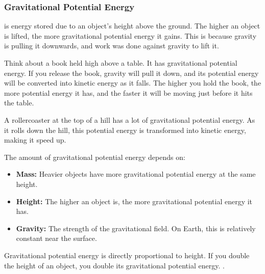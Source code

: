 \subsubsection{Gravitational Potential Energy}

 is energy stored due to an object's height above the ground.  The higher an object is lifted, the more gravitational potential energy it gains. This is because gravity is pulling it downwards, and work was done against gravity to lift it.


Think about a book held high above a table. It has gravitational potential energy. If you release the book, gravity will pull it down, and its potential energy will be converted into kinetic energy as it falls. The higher you hold the book, the more potential energy it has, and the faster it will be moving just before it hits the table.

\begin{example}
A rollercoaster at the top of a hill has a lot of gravitational potential energy. As it rolls down the hill, this potential energy is transformed into kinetic energy, making it speed up.
\end{example}

The amount of gravitational potential energy depends on:

\begin{itemize}
    \item \textbf{Mass:} Heavier objects have more gravitational potential energy at the same height.
    \item \textbf{Height:} The higher an object is, the more gravitational potential energy it has.
    \item \textbf{Gravity:} The strength of the gravitational field. On Earth, this is relatively constant near the surface.
\end{itemize}

\begin{marginnote}
Gravitational potential energy is directly proportional to height.  If you double the height of an object, you double its gravitational potential energy. .
\end{marginnote}

